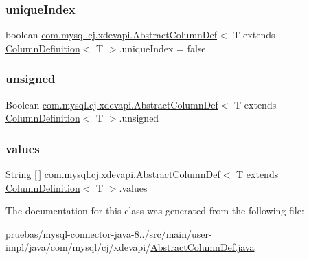 \subsubsection{\texorpdfstring{unique\+Index}{uniqueIndex}}
{\footnotesize\ttfamily boolean \mbox{\hyperlink{classcom_1_1mysql_1_1cj_1_1xdevapi_1_1_abstract_column_def}{com.\+mysql.\+cj.\+xdevapi.\+Abstract\+Column\+Def}}$<$ T extends \mbox{\hyperlink{interfacecom_1_1mysql_1_1cj_1_1protocol_1_1_column_definition}{Column\+Definition}}$<$ T $>$.unique\+Index = false\hspace{0.3cm}{\ttfamily [protected]}}

\mbox{\label{classcom_1_1mysql_1_1cj_1_1xdevapi_1_1_abstract_column_def_a2196259cc3567816b76588aeb01b90ba}} 
\subsubsection{\texorpdfstring{unsigned}{unsigned}}
{\footnotesize\ttfamily Boolean \mbox{\hyperlink{classcom_1_1mysql_1_1cj_1_1xdevapi_1_1_abstract_column_def}{com.\+mysql.\+cj.\+xdevapi.\+Abstract\+Column\+Def}}$<$ T extends \mbox{\hyperlink{interfacecom_1_1mysql_1_1cj_1_1protocol_1_1_column_definition}{Column\+Definition}}$<$ T $>$.unsigned\hspace{0.3cm}{\ttfamily [protected]}}

\mbox{\label{classcom_1_1mysql_1_1cj_1_1xdevapi_1_1_abstract_column_def_a19e2f7c1bacd7ae112ed78d603b66400}} 
\subsubsection{\texorpdfstring{values}{values}}
{\footnotesize\ttfamily String \mbox{[}$\,$\mbox{]} \mbox{\hyperlink{classcom_1_1mysql_1_1cj_1_1xdevapi_1_1_abstract_column_def}{com.\+mysql.\+cj.\+xdevapi.\+Abstract\+Column\+Def}}$<$ T extends \mbox{\hyperlink{interfacecom_1_1mysql_1_1cj_1_1protocol_1_1_column_definition}{Column\+Definition}}$<$ T $>$.values\hspace{0.3cm}{\ttfamily [protected]}}



The documentation for this class was generated from the following file\+:\begin{DoxyCompactItemize}
\item 
pruebas/mysql-\/connector-\/java-\/8../src/main/user-\/impl/java/com/mysql/cj/xdevapi/\mbox{\hyperlink{_abstract_column_def_8java}{Abstract\+Column\+Def.\+java}}\end{DoxyCompactItemize}
